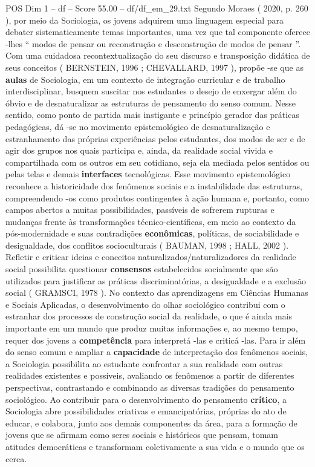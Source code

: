 \begin{textsample}{POS Dim 1 – df – Score 55.00 – df/df\_em\_29.txt}
Segundo Moraes ( 2020, p. 260 ), por meio da Sociologia, os jovens adquirem uma linguagem especial para debater sistematicamente temas importantes, uma vez que tal componente oferece -lhes “ modos de pensar ou reconstrução e desconstrução de modos de pensar ”.
Com uma cuidadosa recontextualização do seu discurso e transposição didática de seus conceitos ( BERNSTEIN, 1996 ; CHEVALLARD, 1997 ), propõe -se que as \textbf{aulas} de Sociologia, em um contexto de integração curricular e de trabalho interdisciplinar, busquem suscitar nos estudantes o desejo de enxergar além do óbvio e de desnaturalizar as estruturas de pensamento do senso comum.
Nesse sentido, como ponto de partida mais instigante e princípio gerador das práticas pedagógicas, dá -se no movimento epistemológico de desnaturalização e estranhamento das próprias experiências pelos estudantes, dos modos de ser e de agir dos grupos nos quais participa e, ainda, da realidade social vivida e compartilhada com os outros em seu cotidiano, seja ela mediada pelos sentidos ou pelas telas e demais \textbf{interfaces} tecnológicas.
Esse movimento epistemológico reconhece a historicidade dos fenômenos sociais e a instabilidade das estruturas, compreendendo -os como produtos contingentes à ação humana e, portanto, como campos abertos a muitas possibilidades, passíveis de sofrerem rupturas e mudanças frente às transformações técnico-científicas, em meio ao contexto da pós-modernidade e suas contradições \textbf{econômicas}, políticas, de sociabilidade e desigualdade, dos conflitos socioculturais ( BAUMAN, 1998 ; HALL, 2002 ).
Refletir e criticar ideias e conceitos naturalizados/naturalizadores da realidade social possibilita questionar \textbf{consensos} estabelecidos socialmente que são utilizados para justificar as práticas discriminatórias, a desigualdade e a exclusão social ( GRAMSCI, 1978 ).
No contexto das aprendizagens em Ciências Humanas e Sociais Aplicadas, o desenvolvimento do olhar sociológico contribui com o estranhar dos processos de construção social da realidade, o que é ainda mais importante em um mundo que produz muitas informações e, ao mesmo tempo, requer dos jovens a \textbf{competência} para interpretá -las e criticá -las.
Para ir além do senso comum e ampliar a \textbf{capacidade} de interpretação dos fenômenos sociais, a Sociologia possibilita ao estudante confrontar a sua realidade com outras realidades existentes e possíveis, avaliando os fenômenos a partir de diferentes perspectivas, contrastando e combinando as diversas tradições do pensamento sociológico.
Ao contribuir para o desenvolvimento do pensamento \textbf{crítico}, a Sociologia abre possibilidades criativas e emancipatórias, próprias do ato de educar, e colabora, junto aos demais componentes da área, para a formação de jovens que se afirmam como seres sociais e históricos que pensam, tomam atitudes democráticas e transformam coletivamente a sua vida e o mundo que os cerca.


\end{textsample}
